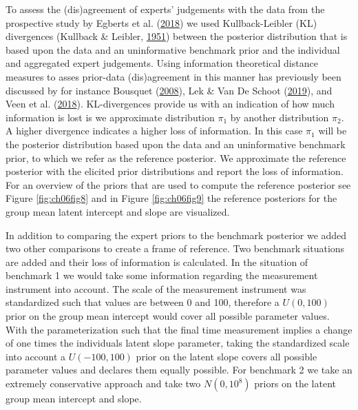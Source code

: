 \documentclass[openright,titlepage,12pt,a4paper]{book}
\begin{document}
To assess the (dis)agreement of experts' judgements with the data from the prospective study by Egberts et al. (\protect\hyperlink{ref-egberts_mother_2018}{2018}) we used Kullback-Leibler (KL) divergences (Kullback \& Leibler, \protect\hyperlink{ref-kullback_information_1951}{1951}) between the posterior distribution that is based upon the data and an uninformative benchmark prior and the individual and aggregated expert judgements. Using information theoretical distance measures to asses prior-data (dis)agreement in this manner has previously been discussed by for instance Bousquet (\protect\hyperlink{ref-bousquet_diagnostics_2008}{2008}), Lek \& Van De Schoot (\protect\hyperlink{ref-lek_how_2019}{2019}), and Veen et al. (\protect\hyperlink{ref-veen_using_2018}{2018}). KL-divergences provide us with an indication of how much information is lost is we approximate distribution \(\pi_1\) by another distribution \(\pi_2\). A higher divergence indicates a higher loss of information. In this case \(\pi_1\) will be the posterior distribution based upon the data and an uninformative benchmark prior, to which we refer as the reference posterior. We approximate the reference posterior with the elicited prior distributions and report the loss of information. For an overview of the priors that are used to compute the reference posterior see Figure \ref{fig:ch06fig8} and in Figure \ref{fig:ch06fig9} the reference posteriors for the group mean latent intercept and slope are visualized.

In addition to comparing the expert priors to the benchmark posterior we added two other comparisons to create a frame of reference. Two benchmark situations are added and their loss of information is calculated. In the situation of benchmark 1 we would take some information regarding the measurement instrument into account. The scale of the measurement instrument was standardized such that values are between 0 and 100, therefore a \(U(0, 100)\) prior on the group mean intercept would cover all possible parameter values. With the parameterization such that the final time measurement implies a change of one times the individuals latent slope parameter, taking the standardized scale into account a \(U(-100, 100)\) prior on the latent slope covers all possible parameter values and declares them equally possible. For benchmark 2 we take an extremely conservative approach and take two \(N(0, 10^8)\) priors on the latent group mean intercept and slope.
\end{document}
